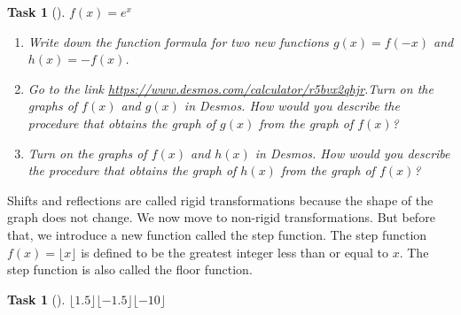 \documentclass[10pt,]{article}
\theoremstyle{plain}
\newtheorem{proposition}[theorem]{Task}
\theoremstyle{definition}
\numberwithin{equation}{section}
\begin{document}
\begin{proposition}[{}]\label{proposition-39}
\(f(x)=e^x\)\leavevmode%
\begin{enumerate}
\item\hypertarget{li-201}{}Write down the function formula for two new functions \(g(x) = f(-x)\) and \(h(x) = -f(x)\).%
\item\hypertarget{li-202}{}Go to the link \href{https://www.desmos.com/calculator/r5bvx2qhjr}{https://www.desmos.com/calculator/r5bvx2qhjr}.Turn on the graphs of \(f(x)\) and \(g(x)\) in Desmos. How would you describe the procedure that obtains the graph of \(g(x)\) from the graph of \(f(x)\)?%
\item\hypertarget{li-203}{}Turn on the graphs of \(f(x)\) and \(h(x)\) in Desmos. How would you describe the procedure that obtains the graph of \(h(x)\) from the graph of \(f(x)\)?%
\end{enumerate}
\end{proposition}
\hypertarget{p-102}{}%
Shifts and reflections are called rigid transformations because the shape of the graph does not change. We now move to non-rigid transformations. But before that, we introduce a new function called the step function. The step function \(f(x) = \lfloor x \rfloor\) is defined to be the greatest integer less than or equal to \(x\). The step function is also called the floor function.%
\begin{proposition}[{}]\label{proposition-40}
\(\lfloor 1.5 \rfloor\)\(\lfloor -1.5 \rfloor\)\(\lfloor -10 \rfloor\)\end{proposition}
\end{document}
